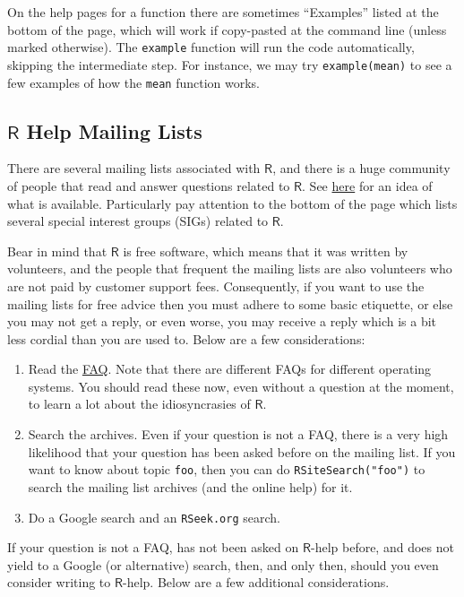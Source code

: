 \documentclass[captions=tableheading]{scrbook}
\begin{document}
On the help pages for a function there are sometimes ``Examples'' listed at the bottom of the page, which will work if copy-pasted at the command line (unless marked otherwise). The \texttt{example} function will run the code automatically, skipping the intermediate step. For instance, we may try \texttt{example(mean)} to see a few examples of how the \texttt{mean} function works.
\subsection{\(\mathsf{R}\) Help Mailing Lists}
\label{sec-2-4-1}


There are several mailing lists associated with \(\mathsf{R}\), and there is a huge community of people that read and answer questions related to \(\mathsf{R}\). See \href{http://www.r-project.org/mail.html}{here} for an idea of what is available. Particularly pay attention to the bottom of the page which lists several special interest groups (SIGs) related to \(\mathsf{R}\).

Bear in mind that \(\mathsf{R}\) is free software, which means that it was written by volunteers, and the people that frequent the mailing lists are also volunteers who are not paid by customer support fees. Consequently, if you want to use the mailing lists for free advice then you must adhere to some basic etiquette, or else you may not get a reply, or even worse, you may receive a reply which is a bit less cordial than you are used to. Below are a few considerations: 
\begin{enumerate}
\item Read the \href{http://cran.r-project.org/faqs.html}{FAQ}. Note that there are different FAQs for different operating systems. You should read these now, even without a question at the moment, to learn a lot about the idiosyncrasies of \(\mathsf{R}\).
\item Search the archives. Even if your question is not a FAQ, there is a very high likelihood that your question has been asked before on the mailing list. If you want to know about topic \texttt{foo}, then you can do \texttt{RSiteSearch("foo")} to search the mailing list archives (and the online help) for it.
\item Do a Google search and an \texttt{RSeek.org} search.
\end{enumerate}

If your question is not a FAQ, has not been asked on \(\mathsf{R}\)-help before, and does not yield to a Google (or alternative) search, then, and only then, should you even consider writing to \(\mathsf{R}\)-help. Below are a few additional considerations. 
\end{document}
